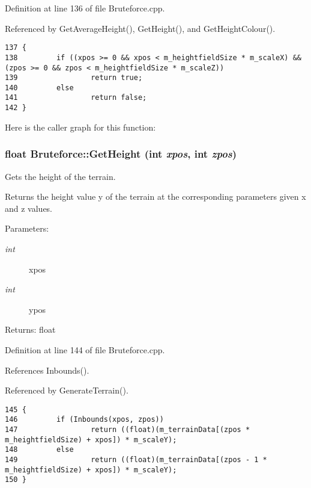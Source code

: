 Definition at line 136 of file Bruteforce.cpp.

Referenced by GetAverageHeight(), GetHeight(), and GetHeightColour().

\begin{Code}\begin{verbatim}137 {
138         if ((xpos >= 0 && xpos < m_heightfieldSize * m_scaleX) && (zpos >= 0 && zpos < m_heightfieldSize * m_scaleZ))
139                 return true;
140         else
141                 return false;
142 }
\end{verbatim}
\end{Code}




Here is the caller graph for this function:\hypertarget{class_bruteforce_6ffaafd89058fdd7a2bdc946aa5aa24b}{
\subsubsection[GetHeight]{\setlength{\rightskip}{0pt plus 5cm}float Bruteforce::GetHeight (int {\em xpos}, \/  int {\em zpos})}}
\label{class_bruteforce_6ffaafd89058fdd7a2bdc946aa5aa24b}


Gets the height of the terrain. 

Returns the height value y of the terrain at the corresponding parameters given x and z values.

\begin{Desc}
\item[Parameters:]
\begin{description}
\item[{\em int}]xpos \item[{\em int}]ypos \end{description}
\end{Desc}
\begin{Desc}
\item[Returns:]float \end{Desc}


Definition at line 144 of file Bruteforce.cpp.

References Inbounds().

Referenced by GenerateTerrain().

\begin{Code}\begin{verbatim}145 {
146         if (Inbounds(xpos, zpos))
147                 return ((float)(m_terrainData[(zpos * m_heightfieldSize) + xpos]) * m_scaleY);
148         else
149                 return ((float)(m_terrainData[(zpos - 1 * m_heightfieldSize) + xpos]) * m_scaleY);
150 }
\end{verbatim}
\end{Code}




